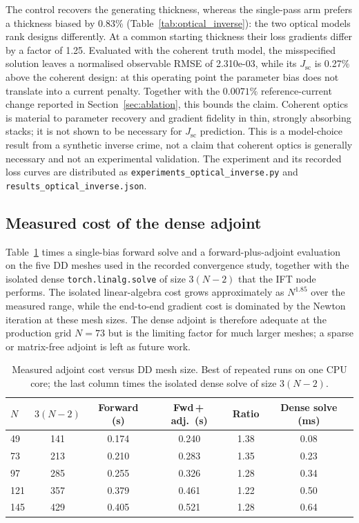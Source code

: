 \documentclass[preprint,12pt]{elsarticle}
\begin{document}
The control recovers the generating thickness, whereas the single-pass arm
prefers a thickness biased by 0.83\% (Table~\ref{tab:optical_inverse}):
the two optical models rank designs differently. At a common starting
thickness their loss gradients differ by a factor of 1.25. Evaluated
with the coherent truth model, the misspecified solution leaves a normalised
observable RMSE of 2.310e-03, while its $J_{\mathrm{sc}}$ is
0.27\% above the coherent design: at this operating point the parameter bias
does not translate into a current penalty. Together with the $0.0071\%$
reference-current change reported in Section~\ref{sec:ablation}, this bounds
the claim. Coherent optics is material to parameter recovery and gradient
fidelity in thin, strongly absorbing stacks; it is not shown to be necessary
for $J_{\mathrm{sc}}$ prediction. This is a model-choice result from a
synthetic inverse crime, not a claim that coherent optics is generally
necessary and not an experimental validation. The experiment and its recorded
loss curves are distributed as \texttt{experiments\_optical\_inverse.py} and
\texttt{results\_optical\_inverse.json}.

\subsection{Measured cost of the dense adjoint}
\label{sec:evidence-scaling}

Table~\ref{tab:adjoint_scaling} times a single-bias forward solve and a
forward-plus-adjoint evaluation on the five DD meshes used in the recorded
convergence study, together with the isolated dense
\texttt{torch.linalg.solve} of size $3(N-2)$ that the IFT node performs.
The isolated linear-algebra cost grows approximately as
$N^{1.85}$ over the measured range, while the end-to-end gradient
cost is dominated by the Newton iteration at these mesh sizes. The dense
adjoint is therefore adequate at the production grid $N=73$ but is the
limiting factor for much larger meshes; a sparse or matrix-free adjoint is
left as future work.

\begin{table}[t]
\caption{Measured adjoint cost versus DD mesh size. Best of repeated runs on
one CPU core; the last column times the isolated dense solve of size
$3(N-2)$.}
\label{tab:adjoint_scaling}
\centering
\footnotesize
\begin{tabular}{lccccc}
\toprule
$N$ & $3(N-2)$ & Forward (s) & Fwd\,+\,adj.\ (s) & Ratio & Dense solve (ms) \\
\midrule
49 & 141 & 0.174 & 0.240 & 1.38 & 0.08 \\
73 & 213 & 0.210 & 0.283 & 1.35 & 0.23 \\
97 & 285 & 0.255 & 0.326 & 1.28 & 0.34 \\
121 & 357 & 0.379 & 0.461 & 1.22 & 0.50 \\
145 & 429 & 0.405 & 0.521 & 1.28 & 0.64 \\
\bottomrule
\end{tabular}
\end{table}
\end{document}
